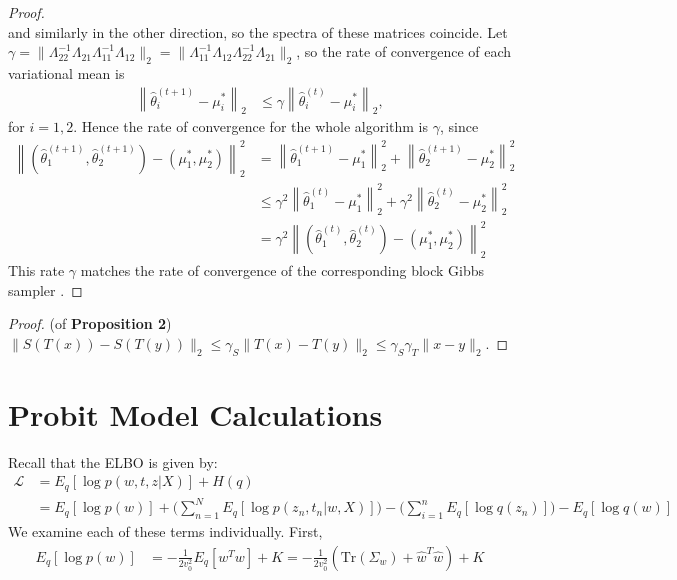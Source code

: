 \documentclass{article}
\begin{document}
\begin{proof}
$$$$
\noindent and similarly in the other direction, so the spectra of these matrices coincide. Let $\gamma = \|\Lambda_{22}^{-1}\Lambda_{21}\Lambda_{11}^{-1}\Lambda_{12}\|_2 = \|\Lambda_{11}^{-1}\Lambda_{12}\Lambda_{22}^{-1}\Lambda_{21}\|_2$, so the rate of convergence of each variational mean is
\begin{align}
\left\|\widehat\theta_i^{(t+1)} - \mu_i^*\right\|_2
&\le \gamma\left\|\widehat\theta_i^{(t)} - \mu_i^*\right\|_2,
\end{align}
for $i=1,2$. Hence the rate of convergence for the whole algorithm is $\gamma$, since
\begin{align}
\left\|(\widehat\theta_1^{(t+1)},\widehat\theta_2^{(t+1)})-(\mu_1^*,\mu_2^*)\right\|_2^2
&=\left\|\widehat\theta_1^{(t+1)}-\mu_1^*\right\|_2^2 + \left\|\widehat\theta_2^{(t+1)}-\mu_2^*\right\|_2^2\\
&\le \gamma^2\left\|\widehat\theta_1^{(t)}-\mu_1^*\right\|_2^2 + \gamma^2\left\|\widehat\theta_2^{(t)}-\mu_2^*\right\|_2^2 \\
&= \gamma^2\left\|(\widehat\theta_1^{(t)},\widehat\theta_2^{(t)})-(\mu_1^*,\mu_2^*)\right\|_2^2 
\end{align}
This rate $\gamma$ matches the rate of convergence of the corresponding block Gibbs sampler \cite{Sahu}.
\end{proof}


\begin{proof} (of {\bf Proposition 2}) $\|S(T(x))-S(T(y))\|_2\le \gamma_S\|T(x) - T(y)\|_2 \le \gamma_S\gamma_T\|x-y\|_2$.%
\end{proof}


\newpage


\section{Probit Model Calculations}
\label{probit_append}

 Recall that the ELBO is given by:
\begin{align}
\mathcal L &= E_q[\log p(w,t,z|X)] + H(q) \\
	&=  E_q[\log p(w)] + \Big(\sum_{n=1}^N E_q[\log p(z_n,t_n|w,X)]\Big) - \Big(\sum_{i=1}^n E_q[\log q(z_n)]\Big) - E_q[\log q(w)] 
\end{align} 
We examine each of these terms individually. First, 
\begin{align}
E_q[\log p(w)] &= -\frac{1}{2v_0^2} E_q[w^Tw] + K
	= -\frac{1}{2v_0^2} (\text{Tr}(\Sigma_w) + \hat w^T \hat w) + K
\end{align}
\end{document}
